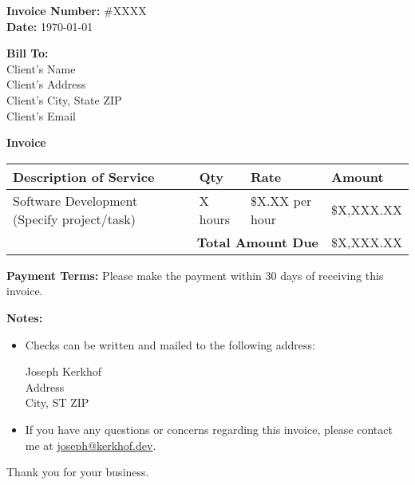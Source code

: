 \documentclass[a4paper, 11pt]{article}
\begin{document}
\begin{flushright}
    \textbf{Invoice Number:} \#XXXX \\
    \textbf{Date:} \today
\end{flushright}

\begin{flushleft}
\textbf{Bill To:} \\
Client's Name \\
Client's Address \\
Client's City, State ZIP \\
Client's Email
\end{flushleft}

\vspace{2em}

\begin{center}
\textbf{\Large Invoice}
\end{center}

\begin{tabular}{|p{}|p{}|p{}|p{}|}
    \hline
    \textbf{Description of Service} & \textbf{Qty} & \textbf{Rate} & \textbf{Amount} \\
    \hline
    Software Development (Specify project/task) & X hours & \$X.XX per hour & \$X,XXX.XX \\
    \hline
    \multicolumn{3}{|r|}{\textbf{Total Amount Due}} & \$X,XXX.XX \\
    \hline
\end{tabular}

\vspace{2em}

\textbf{Payment Terms:} Please make the payment within 30 days of receiving this invoice.

\vspace{2em}

\textbf{Notes:}
\begin{itemize}
    \item Checks can be written and mailed to the following address:

    Joseph Kerkhof \\
    Address \\
    City, ST ZIP

    \item If you have any questions or concerns regarding this invoice, please contact me at \href{mailto:joseph@kerkhof.dev}{joseph@kerkhof.dev}.
\end{itemize}

\vspace{2em}

Thank you for your business.
\end{document}
